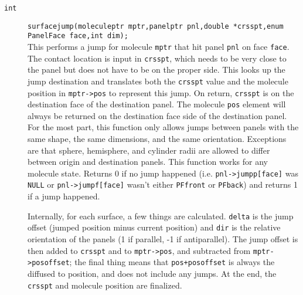 \documentclass {scrbook}
\newcommand {\ttt} {\texttt}
\begin{document}
\begin{description}
\item[\ttt{int}]
\ttt{surfacejump(moleculeptr mptr,panelptr pnl,double *crsspt,enum PanelFace face,int dim);}
\hfill \\
This performs a jump for molecule \ttt{mptr} that hit panel \ttt{pnl} on face \ttt{face}. The contact location is input in \ttt{crsspt}, which needs to be very close to the panel but does not have to be on the proper side. This looks up the jump destination and translates both the \ttt{crsspt} value and the molecule position in \ttt{mptr->pos} to represent this jump. On return, \ttt{crsspt} is on the destination face of the destination panel. The molecule \ttt{pos} element will always be returned on the destination face side of the destination panel. For the most part, this function only allows jumps between panels with the same shape, the same dimensions, and the same orientation. Exceptions are that sphere, hemisphere, and cylinder radii are allowed to differ between origin and destination panels. This function works for any molecule state. Returns 0 if no jump happened (i.e. \ttt{pnl->jumpp[face]} was \ttt{NULL} or \ttt{pnl->jumpf[face]} wasn't either \ttt{PFfront} or \ttt{PFback}) and returns 1 if a jump happened.

Internally, for each surface, a few things are calculated. \ttt{delta} is the jump offset (jumped position minus current position) and \ttt{dir} is the relative orientation of the panels (1 if parallel, -1 if antiparallel). The jump offset is then added to \ttt{crsspt} and to \ttt{mptr->pos}, and subtracted from \ttt{mptr->posoffset}; the final thing means that \ttt{pos+posoffset} is always the diffused to position, and does not include any jumps. At the end, the \ttt{crsspt} and molecule position are finalized.


\end{description}
\end{document}
